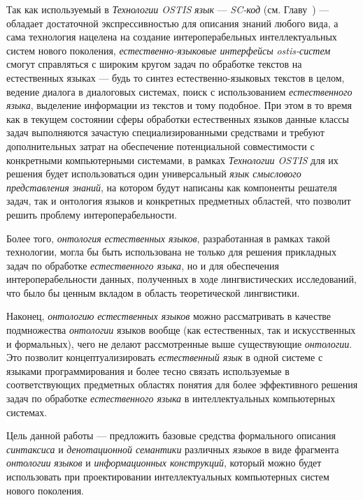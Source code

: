Так как используемый в \textit{Технологии OSTIS} \textit{язык} --- \textit{SC-код} (см. Главу~) --- обладает достаточной экспрессивностью для описания знаний любого вида, а сама технология нацелена на создание интероперабельных интеллектуальных систем нового поколения, \textit{естественно-языковые интерфейсы} \textit{ostis-систем} смогут справляться с широким кругом задач по обработке текстов на естественных языках --- будь то синтез естественно-языковых текстов в целом, ведение диалога в диалоговых системах, поиск с использованием \textit{естественного языка}, выделение информации из текстов и тому подобное.
При этом в то время как в текущем состоянии сферы обработки естественных языков данные классы задач выполняются зачастую специализированными средствами и требуют дополнительных затрат на обеспечение потенциальной совместимости с конкретными компьютерными системами, в рамках \textit{Технологии OSTIS} для их решения будет использоваться один универсальный \textit{язык смыслового представления знаний}, на котором будут написаны как компоненты решателя задач, так и онтология языков и конкретных предметных областей, что позволит решить проблему интероперабельности.

Более того, \textit{онтология} \textit{естественных языков}, разработанная в рамках такой технологии, могла бы быть использована не только для решения прикладных задач по обработке \textit{естественного языка}, но и для обеспечения интероперабельности данных, полученных в ходе лингвистических исследований, что было бы ценным вкладом в область теоретической лингвистики.

Наконец, \textit{онтологию} \textit{естественных языков} можно рассматривать в качестве подмножества \textit{онтологии} языков вообще (как естественных, так и искусственных и формальных), чего не делают рассмотренные выше существующие \textit{онтологии}.
Это позволит концептуализировать \textit{естественный язык} в одной системе с языками программирования и более тесно связать используемые в соответствующих предметных областях понятия для более эффективного решения задач по обработке \textit{естественного языка} в интеллектуальных компьютерных системах.

Цель данной работы --- предложить базовые средства формального описания \textit{синтаксиса} и \textit{денотационной семантики} различных \textit{языков} в виде фрагмента \textit{онтологии} \textit{языков} и \textit{информационных конструкций}, который можно будет использовать при проектировании интеллектуальных компьютерных систем нового поколения.

